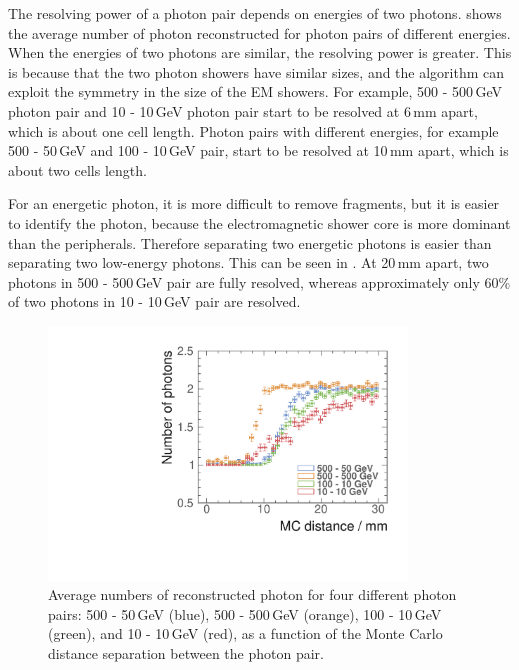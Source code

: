 The resolving power of a photon pair depends on energies of two photons.  shows the average number of photon reconstructed for photon pairs of different energies. When the energies of two photons are similar, the resolving power is greater. This is because that the two photon showers have similar sizes, and the \peakFinding algorithm can exploit the symmetry in the size of the EM showers. For example, 500 - 500\,GeV photon pair and 10 - 10\,GeV photon pair start to be resolved at 6\,mm apart, which is about one \ECAL cell length. Photon pairs with different energies, for example 500 - 50\,GeV and  100 - 10\,GeV pair, start to be resolved at 10\,mm apart, which is about two \ECAL cells length.

For an energetic photon, it is more difficult to remove fragments, but it is easier to identify the photon, because the electromagnetic shower core is more dominant than the peripherals. Therefore separating two energetic photons is easier than separating two low-energy photons. This can be seen in . At 20\,mm apart, two photons in  500 - 500\,GeV pair are fully resolved, whereas approximately only 60\% of two photons in 10 - 10\,GeV pair are resolved.

\begin{figure}[tbph]
\centering
        \includegraphics[width=0.85\textwidth]{photon/DoubleCompareEnergies.pdf}
        \caption{Average numbers of reconstructed photon for four different photon pairs: 500 - 50\,GeV (blue), 500 - 500\,GeV (orange), 100 - 10\,GeV (green), and 10 - 10\,GeV (red), as a function of the Monte Carlo distance separation between the photon pair.}
        \label{fig:photonDoubleCompareEnergies}
\end{figure}

